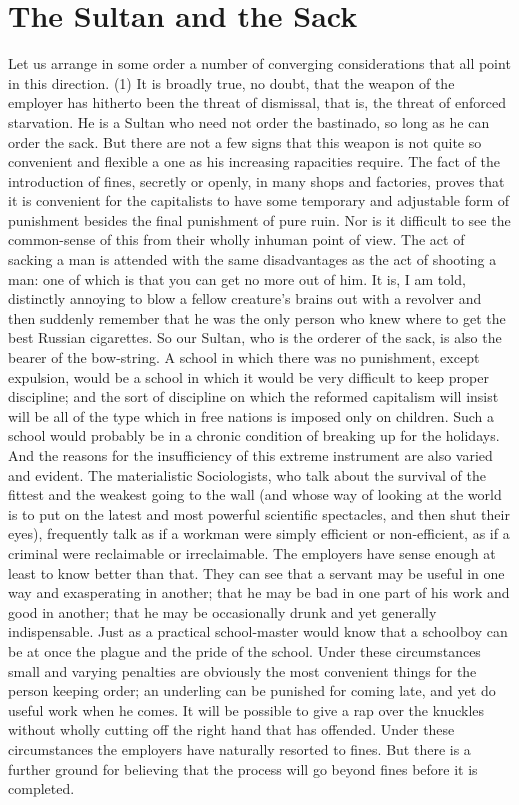 \documentclass{book}
\begin{document}
\section{The Sultan and the Sack}
Let us arrange in some order a number of converging considerations that all point in this direction. (1) It is broadly true, no doubt, that the weapon of the employer has hitherto been the threat of dismissal, that is, the threat of enforced starvation. He is a Sultan who need not order the bastinado, so long as he can order the sack. But there are not a few signs that this weapon is not quite so convenient and flexible a one as his increasing rapacities require. The fact of the introduction of fines, secretly or openly, in many shops and factories, proves that it is convenient for the capitalists to have some temporary and adjustable form of punishment besides the final punishment of pure ruin. Nor is it difficult to see the common-sense of this from their wholly inhuman point of view. The act of sacking a man is attended with the same disadvantages as the act of shooting a man: one of which is that you can get no more out of him. It is, I am told, distinctly annoying to blow a fellow creature’s brains out with a revolver and then suddenly remember that he was the only person who knew where to get the best Russian cigarettes. So our Sultan, who is the orderer of the sack, is also the bearer of the bow-string. A school in which there was no punishment, except expulsion, would be a school in which it would be very difficult to keep proper discipline; and the sort of discipline on which the reformed capitalism will insist will be all of the type which in free nations is imposed only on children. Such a school would probably be in a chronic condition of breaking up for the holidays. And the reasons for the insufficiency of this extreme instrument are also varied and evident. The materialistic Sociologists, who talk about the survival of the fittest and the weakest going to the wall (and whose way of looking at the world is to put on the latest and most powerful scientific spectacles, and then shut their eyes), frequently talk as if a workman were simply efficient or non-efficient, as if a criminal were reclaimable or irreclaimable. The employers have sense enough at least to know better than that. They can see that a servant may be useful in one way and exasperating in another; that he may be bad in one part of his work and good in another; that he may be occasionally drunk and yet generally indispensable. Just as a practical school-master would know that a schoolboy can be at once the plague and the pride of the school. Under these circumstances small and varying penalties are obviously the most convenient things for the person keeping order; an underling can be punished for coming late, and yet do useful work when he comes. It will be possible to give a rap over the knuckles without wholly cutting off the right hand that has offended. Under these circumstances the employers have naturally resorted to fines. But there is a further ground for believing that the process will go beyond fines before it is completed.
\end{document}
